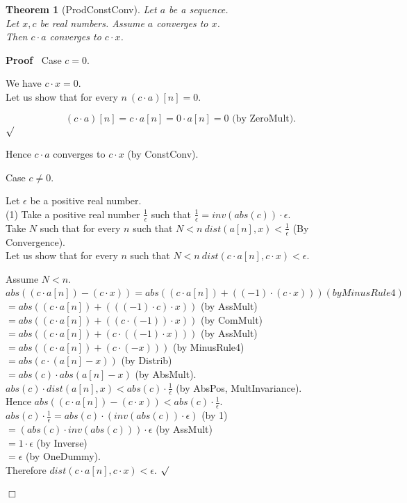 \documentclass{article}
\newenvironment{forthel}{\begin{leftbar}}{\end{leftbar}}
\newenvironment{proof}{\noindent\textbf{Proof\ }}{\hspace*{\fill}$\Box$\medskip}
\newenvironment{subproof}{\begin{list}{}{}
		\item[\text{Proof}]}{\hfill $\surd$ \end{list}}
\newenvironment{case}{\begin{list}{}{}
		\item[]}{\end{list}}
\newtheorem{theorem}{Theorem}
\newcommand{\cdottwo}{\cdot}
\newcommand{\inveps}{\frac{1}{\epsilon}}
\newcommand{\dotequal}{=}
\begin{document}
\begin{forthel}
	\begin{theorem}[ProdConstConv]
	Let $a$ be a sequence. \\Let $x,c$ be real numbers. Assume $a$ converges to $x$.
	\\Then $c \cdottwo a$ converges to $c \cdot x$.
	\end{theorem}
	\begin{proof}
	Case $c = 0$.
	\begin{case}
	We have $c \cdot x = 0$.
	\\Let us show that for every $n \ (c \cdottwo a)[n] = 0$. 
	\begin{subproof}
	$$(c \cdottwo a)[n] \dotequal c \cdot a[n]
	\dotequal 0 \cdot a[n]
	\dotequal 0 \text{ (by ZeroMult)}.$$
	\end{subproof}
	Hence $c \cdottwo a$ converges to $c \cdot x$ (by ConstConv).
	\end{case}
	Case $c \neq 0$.
	\begin{case}
	Let $\epsilon$ be a positive real number. 
	\\(1)     Take a positive real number $\inveps$ such that $\inveps = inv(abs(c)) \cdot \epsilon$.
	\\Take $N$ such that for every $n$ such that $N < n \ dist(a[n],x) < \inveps$ (By Convergence).
	\\Let us show that for every $n$ such that $N < n \ dist(c \cdot a[n],c \cdot x) < \epsilon$.
	\begin{subproof}
	Assume $N < n$.
	\\$abs((c \cdot a[n]) - (c \cdot x)) \dotequal abs((c \cdot a[n]) +  ((-1) \cdot (c \cdot x))) (by MinusRule4)$ 
	\\$\dotequal abs((c \cdot a[n]) + (((-1) \cdot c) \cdot x))$ (by AssMult)
	\\$\dotequal abs((c \cdot a[n]) + ((c \cdot (-1)) \cdot x))$ (by ComMult)
	\\$\dotequal abs((c \cdot a[n]) + (c \cdot ((-1) \cdot x)))$ (by AssMult)
	\\$\dotequal abs((c \cdot a[n]) + (c \cdot (-x)))$ (by MinusRule4)
	\\$\dotequal abs(c \cdot (a[n] - x))$ (by Distrib)
	\\$\dotequal abs(c) \cdot abs(a[n] - x)$ (by AbsMult).
	\\$abs(c) \cdot dist(a[n],x) < abs(c) \cdot \inveps$ (by AbsPos, MultInvariance).
	\\Hence $abs((c \cdot a[n]) - (c \cdot x)) < abs(c) \cdot \inveps$.
	\\$abs(c) \cdot \inveps \dotequal abs(c) \cdot (inv(abs(c)) \cdot \epsilon)$ (by 1)
	\\$\dotequal (abs(c) \cdot inv(abs(c))) \cdot \epsilon$ (by AssMult)
	\\$\dotequal 1 \cdot \epsilon$ (by Inverse)
	\\$\dotequal \epsilon$ (by OneDummy).
	\\Therefore $dist(c \cdot a[n],c \cdot x) < \epsilon$.
	\end{subproof}
	\end{case}
	\end{proof}
	
\end{forthel}
\end{document}
